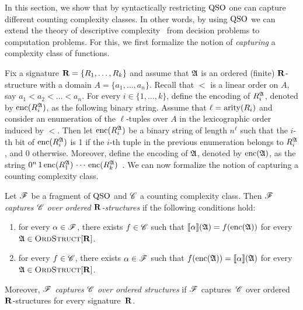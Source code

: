 
In this section, we show that by syntactically restricting ${\rm QSO}$ one can capture different counting complexity classes. 
In other words, by using ${\rm QSO}$ we can extend the theory of descriptive complexity~\cite{immerman1999descriptive} from decision problems to computation problems. 
For this, we first formalize the notion of \emph{capturing} a complexity class of functions.

Fix a signature $\mathbf{R} = \{R_1, \ldots, R_k\}$ and assume that $\mathfrak{A}$ is an ordered (finite) $\mathbf{R}$-structure with a domain $A = \{a_1, \ldots, a_n\}$.
Recall that  $<$ is a linear order on $A$, say $a_1 < a_2 < \ldots < a_n$. For every $i \in \{1, \ldots, k\}$, define the encoding of $R_i^{\mathfrak{A}}$, denoted by ${\rm enc}(R_i^{\mathfrak{A}})$, as the following binary string. Assume that $\ell = {\rm arity}(R_i)$ and consider an enumeration of the $\ell$-tuples over $A$ in the lexicographic order induced by $<$. 
Then let ${\rm enc}(R_i^{\mathfrak{A}})$ be a binary string of length $n^\ell$ such that the $i$-th bit of ${\rm enc}(R_i^{\mathfrak{A}})$ is 1 if the $i$-th tuple in the previous enumeration belongs to $R_i^{\mathfrak{A}}$, and 0 otherwise. Moreover, define the encoding of $\mathfrak{A}$, denoted by ${\rm enc}(\mathfrak{A})$, as the string
$0^n \, 1 \, {\rm enc}(R_1^{\mathfrak{A}}) \, \cdots \, {\rm enc}(R_k^{\mathfrak{A}})$~\cite{L04}. 
We can now formalize the notion of capturing a counting complexity class.
\begin{defi} \label{def:cap}
	Let $\mathscr{F}$ be a fragment of ${\rm QSO}$ and $\mathscr{C}$ a counting complexity class. Then {\em  $\mathscr{F}$ captures $\mathscr{C}$ over ordered $\mathbf{R}$-structures} if the  following conditions hold:
	\begin{enumerate}
		\item for every $\alpha \in \mathscr{F}$, there exists $f \in \mathscr{C}$ such that ${\llbracket{}{\alpha}\rrbracket}(\mathfrak{A}) = f({\rm enc}(\mathfrak{A}))$ for every $\mathfrak{A} \in \text{\sc OrdStruct}[\mathbf{R}]$. 
		
		\item for every $f \in \mathscr{C}$, there exists $\alpha \in \mathscr{F}$ such that   $f({\rm enc}(\mathfrak{A})) = {\llbracket{}{\alpha}\rrbracket}(\mathfrak{A})$ for every $\mathfrak{A} \in \text{\sc OrdStruct}[\mathbf{R}]$.
	\end{enumerate} 
	Moreover, {\em $\mathscr{F}$ captures $\mathscr{C}$ over ordered structures} if $\mathscr{F}$ captures~$\mathscr{C}$ over ordered $\mathbf{R}$-structures for every signature~$\mathbf{R}$.
\end{defi}
